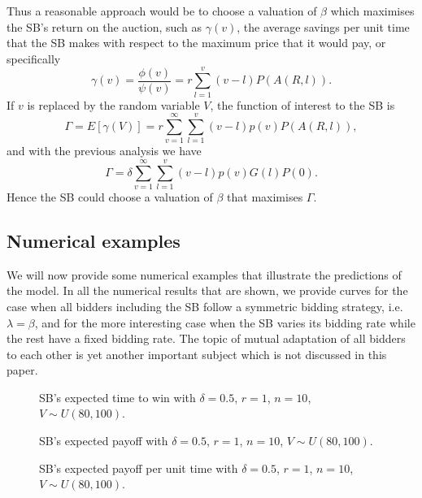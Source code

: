 \documentclass{comjnl}
\begin{document}
Thus a reasonable approach would be to choose a valuation of
$\beta$ which maximises the SB's return on the auction, such as
$\gamma(v)$, the average savings per unit time that the SB makes
with respect to the maximum price that it would pay, or
specifically
\begin{equation}
\gamma(v) = \frac{\phi(v)}{\psi(v)} = r \sum_{l=1}^v
(v-l)P(A(R,l)).
\end{equation}
If $v$ is replaced by the random variable $V$, the function of
interest to the SB is
\begin{equation}\label{SB-objective-av}
\Gamma =E[\gamma(V)]= r\sum_{v=1}^\infty\sum_{l=1}^v
(v-l)p(v)P(A(R,l)),
\end{equation}
and with the previous analysis we have
\begin{equation}
\Gamma = \delta\sum_{v=1}^\infty\sum_{l=1}^v (v-l)p(v)G(l)P(0).
\end{equation}
Hence the SB could choose a valuation of $\beta$ that maximises
$\Gamma$.

\subsection{Numerical examples}

We will now provide some numerical examples that illustrate the
predictions of the model. In all the numerical results that are
shown, we provide curves for the case when all bidders including
the SB follow a symmetric bidding strategy, i.e. $\lambda=\beta$,
and for the more interesting case when the SB varies its bidding
rate while the rest have a fixed bidding rate. The topic of mutual
adaptation of all bidders to each other is yet another important
subject which is not discussed in this paper.

\begin{figure}
\centering
\caption{SB's expected time to win with $\delta=0.5$, $r=1$,
$n=10$, $V\sim U(80,100)$.}\label{fig:ExpTime}
\end{figure}

\begin{figure}
\centering
\caption{SB's expected payoff with $\delta=0.5$, $r=1$, $n=10$,
$V\sim U(80,100)$. }\label{fig:ExpPayoff}
\end{figure}



\begin{figure}
\centering
\caption{SB's expected payoff per unit time with $\delta=0.5$,
$r=1$, $n=10$, $V\sim U(80,100)$. }\label{fig:ExpPayoffPerTime}
\end{figure}
\end{document}
